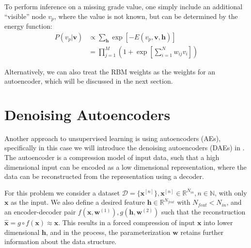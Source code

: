 To perform inference on a missing grade value,
one simply include an additional ``visible'' node $v_p$,
where the value is not known, 
but can be determined by the energy function:
%
\begin{equation*}
\begin{aligned}
    P(v_p|\mathbf{v}) &\propto
        \displaystyle\sum_{\mathbf{h}} 
        \exp[-E(v_p,\mathbf{v},\mathbf{h})] \\
    &= \prod_{j=1}^M \left( 1 + 
        \exp\left[\sum_{i=1}^N w_{ij} v_i\right]
        \right)
\end{aligned}
\end{equation*}

Alternatively, we can also treat 
the RBM weights as the weights for an autoencoder,
which will be discussed in the next section.










\section{Denoising Autoencoders} \label{sc:dae}

\paragraph{}
Another approach to unsupervised learning is using autoencoders (AEs), 
specifically in this case we will introduce the 
denoising autoencoders (DAEs) in \cite{VLLBM10}.
The autoencoder is a compression model of input data, 
such that a high dimensional input can be encoded as 
a low dimensional representation,
where the data can be reconstructed from the representation 
using a decoder.

For this problem we consider a dataset 
$\mathcal{D} = \{\mathbf{x}^{[n]}\}, 
\mathbf{x}^{[n]} \in \mathbb{R}^{N_{in}},
n \in \mathbb{N}$,
with only $\mathbf{x}$ as the input.
We also define a desired feature $\mathbf{h} \in \mathbb{R}^{N_{feat}} $
with $N_{feat} < N_{in}$,
and an encoder-decoder pair 
$f(\mathbf{x},\mathbf{w}^{(1)}), g(\mathbf{h},\mathbf{w}^{(2)})$
such that the reconstruction 
$\hat{\mathbf{x}} = g \circ f(\mathbf{x}) \approx \mathbf{x}$.
This results in a forced compression of input $\mathbf{x}$ 
into lower dimensional $\mathbf{h}$,
and in the process, the parameterization $\mathbf{w}$ retains 
further information about the data structure.

